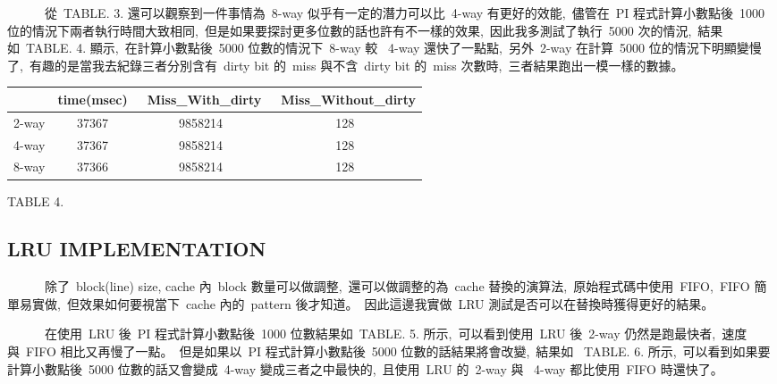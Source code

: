 \documentclass{article}
\begin{document}
\begin{CJK*}{UTF8}{bsmi}
\begin{multicols}{2}
\begin{flushleft}
    \ \ \ \ \ \ 從\ TABLE. 3. 還可以觀察到一件事情為\ 8-way 似乎有一定的潛力可以比\ 4-way 有更好的效能,\
    儘管在\ PI 程式計算小數點後\ 1000 位的情況下兩者執行時間大致相同,\
    但是如果要探討更多位數的話也許有不一樣的效果,\
    因此我多測試了執行\ 5000 次的情況,\
    結果如\ TABLE. 4. 顯示,\
    在計算小數點後\ 5000 位數的情況下\ 8-way 較 \ 4-way 還快了一點點,\
    另外\ 2-way 在計算\ 5000 位的情況下明顯變慢了,\
    有趣的是當我去紀錄三者分別含有\ dirty bit 的\ miss 與不含\ dirty bit 的\ miss 次數時,\
    三者結果跑出一模一樣的數據。
\end{flushleft}

\begin{center}
    \begin{tabular}{|| c c c c ||} 
     \hline
      & time(msec) & \ Miss\_With\_dirty & \ Miss\_Without\_dirty \\ [2ex] 
     \hline\hline
     2-way & 37367 & 9858214 & 128 \\ 
     \hline
     4-way & 37367 & 9858214 & 128 \\ 
     \hline
     8-way & 37366 & 9858214 & 128 \\ 
     \hline
    \end{tabular}
\end{center}

\begin{center}
    \small{TABLE 4.}\\
\end{center}

\newpage

\begin{center}
    \section*{LRU IMPLEMENTATION}
\end{center}

\begin{flushleft}
    \ \ \ \ \ \ 除了\ block(line) size, cache 內\ block 數量可以做調整,\
    還可以做調整的為\ cache 替換的演算法,\
    原始程式碼中使用\ FIFO,\
    FIFO 簡單易實做,\
    但效果如何要視當下\ cache 內的\ pattern 後才知道。\
    因此這邊我實做\ LRU 測試是否可以在替換時獲得更好的結果。
\end{flushleft}

\begin{flushleft}
    \ \ \ \ \ \ 在使用\ LRU 後\ PI 程式計算小數點後\ 1000 位數結果如\ TABLE. 5. 所示,\
    可以看到使用\ LRU 後\ 2-way 仍然是跑最快者,\
    速度與\ FIFO 相比又再慢了一點。\
    但是如果以\ PI 程式計算小數點後\ 5000 位數的話結果將會改變,\
    結果如 \ TABLE. 6. 所示,\
    可以看到如果要計算小數點後\ 5000 位數的話又會變成\ 4-way 變成三者之中最快的,\
    且使用\ LRU 的\ 2-way 與 \ 4-way 都比使用\ FIFO 時還快了。
\end{flushleft}
    

\end{multicols}
\end{CJK*}
\end{document}

